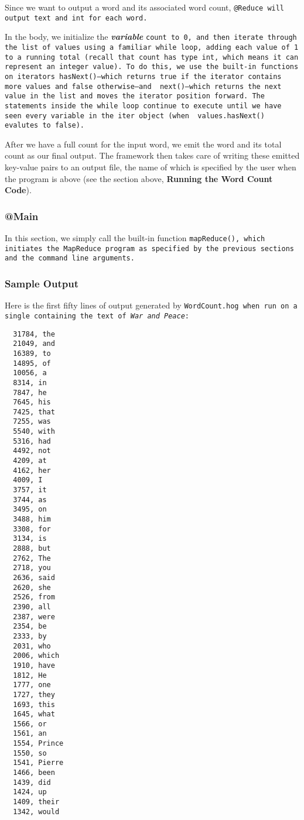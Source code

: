 \documentclass{article} \usepackage{fancyhdr, multicol}
\begin{document}
Since we want to output a word and its associated word count, \tt @Reduce \rm will
output \tt text \rm and \tt int \rm for each word.

In the body, we initialize the \textbf{\emph{variable}} \tt count \rm to \tt 0\rm,
and then iterate through the list of values using a familiar \tt while \rm loop,
adding each value of \tt 1 \rm to a running total (recall that \tt count \rm has
type \tt int\rm, which means it can represent an integer value). To do this, we use
the built-in functions on iterators \tt hasNext()\rm---which returns \tt true \rm
if the iterator contains more values and \tt false \rm otherwise---and \tt
next()\rm---which returns the next value in the \tt list \rm and moves the
iterator position forward. The statements inside the \tt while \rm loop continue to
execute until we have seen every variable in the \tt iter \rm object (when \tt
values.hasNext() \rm evalutes to \tt false\rm).

After we have a full count for the input word, we emit the word and its total count
as our final output. The framework then takes care of writing these emitted
key-value pairs to an output file, the name of which is specified by the user when
the program is above (see the section above, \textbf{Running the Word Count Code}).

\subsubsection*{@Main}

In this section, we simply call the built-in function \tt mapReduce()\rm, which
initiates the MapReduce program as specified by the previous sections and the
command line arguments.

\subsubsection*{Sample Output}

Here is the first fifty lines of output generated by \tt WordCount.hog \rm when run
on a single containing the text of \emph{War and Peace}:

\begin{verbatim}
  31784, the
  21049, and
  16389, to
  14895, of
  10056, a
  8314, in
  7847, he
  7645, his
  7425, that
  7255, was
  5540, with
  5316, had
  4492, not
  4209, at
  4162, her
  4009, I
  3757, it
  3744, as
  3495, on
  3488, him
  3308, for
  3134, is
  2888, but
  2762, The
  2718, you
  2636, said
  2620, she
  2526, from
  2390, all
  2387, were
  2354, be
  2333, by
  2031, who
  2006, which
  1910, have
  1812, He
  1777, one
  1727, they
  1693, this
  1645, what
  1566, or
  1561, an
  1554, Prince
  1550, so
  1541, Pierre
  1466, been
  1439, did
  1424, up
  1409, their
  1342, would
\end{verbatim}
\end{document}
